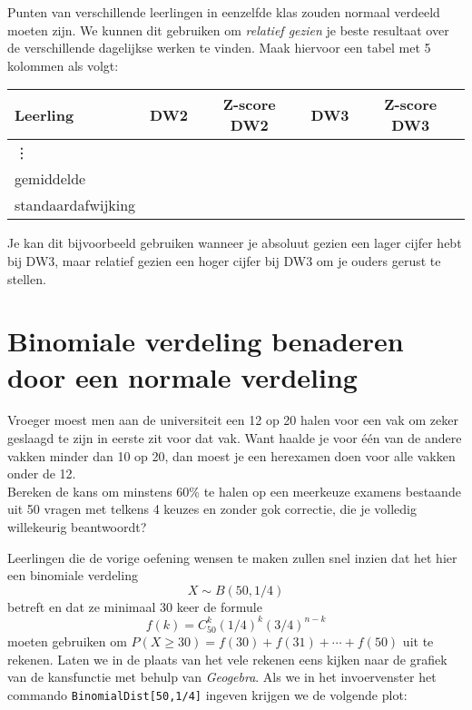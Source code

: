 \documentclass[a4paper,12pt, twoside]{article}
\begin{document}
\begin{oefening}
Punten van verschillende leerlingen in eenzelfde klas zouden normaal verdeeld moeten zijn. We kunnen dit gebruiken om {\em relatief gezien} je beste resultaat over de verschillende dagelijkse werken te vinden. Maak hiervoor een tabel met 5 kolommen als volgt:
\begin{center}
  \begin{tabular}{l|c|c|c|c}
  Leerling & DW2 & Z-score DW2 & DW3 & Z-score DW3\\
  \hline
  \vdots&&&&\\
  \hline
  gemiddelde&&&&\\
  standaardafwijking&&&&\\
  \end{tabular}
\end{center}
Je kan dit bijvoorbeeld gebruiken wanneer je absoluut gezien een lager cijfer hebt bij DW3, maar relatief gezien een hoger cijfer bij DW3 om je ouders gerust te stellen.
\end{oefening}

\cleardoublepage
\section{Binomiale verdeling benaderen door een normale verdeling}

\begin{oefening}
Vroeger moest men aan de universiteit een 12 op 20 halen voor een vak om zeker geslaagd te zijn in eerste zit voor dat vak. Want haalde je voor één van de andere vakken minder dan 10 op 20, dan moest je een herexamen doen voor alle vakken onder de 12.\\
Bereken de kans om minstens 60\% te halen op een meerkeuze examens bestaande uit 50 vragen met telkens 4 keuzes en zonder gok correctie, die je volledig willekeurig beantwoordt?
\end{oefening}

Leerlingen die de vorige oefening wensen te maken zullen snel inzien dat het hier een binomiale verdeling
$$X\sim B(50, 1/4)$$
betreft en dat ze minimaal 30 keer de formule
$$f(k)=C_{50}^{k}(1/4)^k(3/4)^{n-k}$$
moeten gebruiken om $P(X\geq 30)=f(30)+f(31)+\cdots +f(50)$ uit te rekenen. Laten we in de plaats van het vele rekenen eens kijken naar de grafiek van de kansfunctie met behulp van {\em Geogebra}. Als we in het invoervenster het commando \verb#BinomialDist[50,1/4]# ingeven krijgen we de volgende plot:
\end{document}
